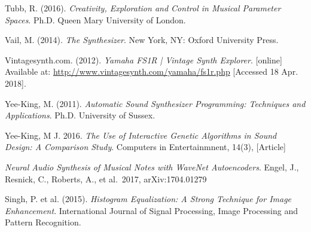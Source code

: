 \documentclass[11pt, oneside]{report}   	%
\begin{document}
\begin{thebibliography}{9}
Tubb, R. (2016). \emph{Creativity, Exploration and Control in Musical Parameter Spaces}. Ph.D. Queen Mary University of London.

Vail, M. (2014). \emph{The Synthesizer}. New York, NY: Oxford University Press.

Vintagesynth.com. (2012). \emph{Yamaha FS1R | Vintage Synth Explorer}. [online] Available at: \url{http://www.vintagesynth.com/yamaha/fs1r.php} [Accessed 18 Apr. 2018].

Yee-King, M. (2011). \emph{Automatic Sound Synthesizer Programming: Techniques and Applications}. Ph.D. University of Sussex.

Yee-King, M J. 2016. \emph{The Use of Interactive Genetic Algorithms in Sound Design: A Comparison Study}. Computers in Entertainmnent, 14(3), [Article]

 \emph{Neural Audio Synthesis of Musical Notes with WaveNet Autoencoders}. Engel, J., Resnick, C., Roberts, A., et al.\ 2017, arXiv:1704.01279 

Singh, P. et al. (2015). \emph{Histogram Equalization: A Strong Technique for Image Enhancement}. International Journal of Signal Processing, Image Processing and Pattern Recognition. %


\end{thebibliography}
\end{document}
